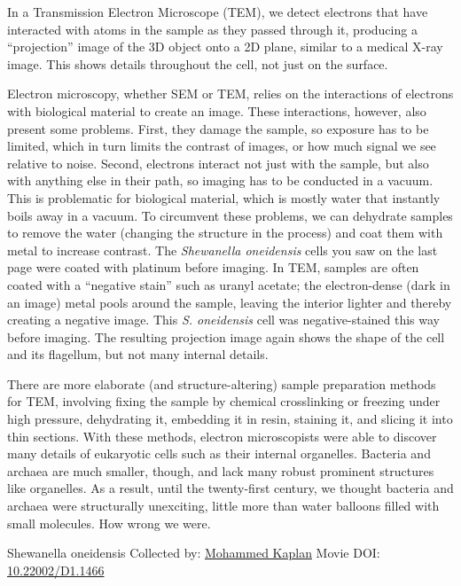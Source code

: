 \documentclass[]{tufte-book}
\begin{document}
In a Transmission Electron Microscope (TEM), we detect electrons that have interacted with atoms in the sample as they passed through it, producing a ``projection'' image of the 3D object onto a 2D plane, similar to a medical X-ray image. This shows details throughout the cell, not just on the surface.

Electron microscopy, whether SEM or TEM, relies on the interactions of electrons with biological material to create an image. These interactions, however, also present some problems. First, they damage the sample, so exposure has to be limited, which in turn limits the contrast of images, or how much signal we see relative to noise. Second, electrons interact not just with the sample, but also with anything else in their path, so imaging has to be conducted in a vacuum. This is problematic for biological material, which is mostly water that instantly boils away in a vacuum. To circumvent these problems, we can dehydrate samples to remove the water (changing the structure in the process) and coat them with metal to increase contrast. The \emph{Shewanella oneidensis} cells you saw on the last page were coated with platinum before imaging. In TEM, samples are often coated with a ``negative stain'' such as uranyl acetate; the electron-dense (dark in an image) metal pools around the sample, leaving the interior lighter and thereby creating a negative image. This \emph{S. oneidensis} cell was negative-stained this way before imaging. The resulting projection image again shows the shape of the cell and its flagellum, but not many internal details.

There are more elaborate (and structure-altering) sample preparation methods for TEM, involving fixing the sample by chemical crosslinking or freezing under high pressure, dehydrating it, embedding it in resin, staining it, and slicing it into thin sections. With these methods, electron microscopists were able to discover many details of eukaryotic cells such as their internal organelles. Bacteria and archaea are much smaller, though, and lack many robust prominent structures like organelles. As a result, until the twenty-first century, we thought bacteria and archaea were structurally unexciting, little more than water balloons filled with small molecules. How wrong we were.



\hypertarget{htmlwidget-8714678d7ceb2f9cd5f7}{}

\label{fig:1-4}Shewanella oneidensis Collected by: \protect\hyperlink{mohammed_kaplan}{Mohammed Kaplan} Movie DOI: \href{https://doi.org/10.22002/D1.1466}{10.22002/D1.1466}
\end{document}
